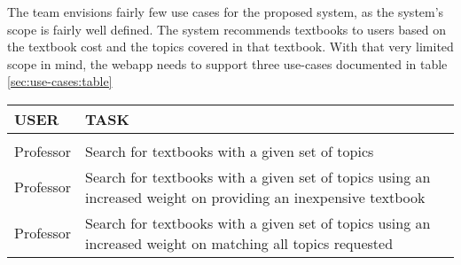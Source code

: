 The team envisions fairly few use cases for the proposed system, as
the system's scope is fairly well defined.
The system recommends textbooks to users based on the textbook cost
and the topics covered in that textbook.
With that very limited scope in mind, the webapp needs to support
three use-cases documented in table \ref{sec:use-cases:table}

\begin{table*}[h]
  \centering
  \caption{Use Cases}
  \begin{tabular}{l p{5cm}}
    \bf USER & \bf TASK \\ \hline \\
    Professor & Search for textbooks with a given set of topics \\
    Professor & Search for textbooks with a given set of topics using
                an increased weight on providing an inexpensive
                textbook \\
    Professor & Search for textbooks with a given set of topics using
                an increased weight on matching all topics requested 
  \end{tabular} \label{sec:use-cases:table}

\end{table*}

